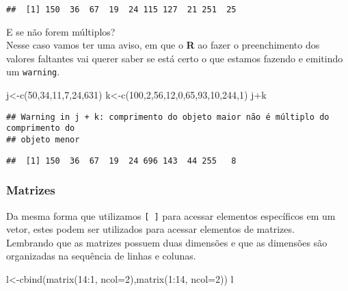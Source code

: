 \documentclass[
]{book}
\newenvironment{Shaded}{\begin{snugshade}}{\end{snugshade}}
\newcommand{\AttributeTok}[1]{\textcolor[rgb]{0.77,0.63,0.00}{#1}}
\newcommand{\DecValTok}[1]{\textcolor[rgb]{0.00,0.00,0.81}{#1}}
\newcommand{\FunctionTok}[1]{\textcolor[rgb]{0.00,0.00,0.00}{#1}}
\newcommand{\NormalTok}[1]{#1}
\newcommand{\OtherTok}[1]{\textcolor[rgb]{0.56,0.35,0.01}{#1}}
\newcommand{\SpecialCharTok}[1]{\textcolor[rgb]{0.00,0.00,0.00}{#1}}
\begin{document}
\begin{verbatim}
##  [1] 150  36  67  19  24 115 127  21 251  25
\end{verbatim}

E se não forem múltiplos?\\
Nesse caso vamos ter uma aviso, em que o \textbf{R} ao fazer o preenchimento dos valores faltantes vai querer saber se está certo o que estamos fazendo e emitindo um \texttt{warning}.

\begin{Shaded}
\begin{Highlighting}[]
\NormalTok{j}\OtherTok{\textless{}{-}}\FunctionTok{c}\NormalTok{(}\DecValTok{50}\NormalTok{,}\DecValTok{34}\NormalTok{,}\DecValTok{11}\NormalTok{,}\DecValTok{7}\NormalTok{,}\DecValTok{24}\NormalTok{,}\DecValTok{631}\NormalTok{)}
\NormalTok{k}\OtherTok{\textless{}{-}}\FunctionTok{c}\NormalTok{(}\DecValTok{100}\NormalTok{,}\DecValTok{2}\NormalTok{,}\DecValTok{56}\NormalTok{,}\DecValTok{12}\NormalTok{,}\DecValTok{0}\NormalTok{,}\DecValTok{65}\NormalTok{,}\DecValTok{93}\NormalTok{,}\DecValTok{10}\NormalTok{,}\DecValTok{244}\NormalTok{,}\DecValTok{1}\NormalTok{)}
\NormalTok{j}\SpecialCharTok{+}\NormalTok{k}
\end{Highlighting}
\end{Shaded}

\begin{verbatim}
## Warning in j + k: comprimento do objeto maior não é múltiplo do comprimento do
## objeto menor
\end{verbatim}

\begin{verbatim}
##  [1] 150  36  67  19  24 696 143  44 255   8
\end{verbatim}

\hypertarget{matrizes}{%
\subsubsection{Matrizes}\label{matrizes}}

Da mesma forma que utilizamos \texttt{{[}\ {]}} para acessar elementos específicos em um vetor, estes podem ser utilizados para acessar elementos de matrizes.\\
Lembrando que as matrizes possuem duas dimensões e que as dimensões são organizadas na sequência de linhas e colunas.

\begin{Shaded}
\begin{Highlighting}[]
\NormalTok{l}\OtherTok{\textless{}{-}}\FunctionTok{cbind}\NormalTok{(}\FunctionTok{matrix}\NormalTok{(}\DecValTok{14}\SpecialCharTok{:}\DecValTok{1}\NormalTok{, }\AttributeTok{ncol=}\DecValTok{2}\NormalTok{),}\FunctionTok{matrix}\NormalTok{(}\DecValTok{1}\SpecialCharTok{:}\DecValTok{14}\NormalTok{, }\AttributeTok{ncol=}\DecValTok{2}\NormalTok{))}
\NormalTok{l}
\end{Highlighting}
\end{Shaded}
\end{document}
